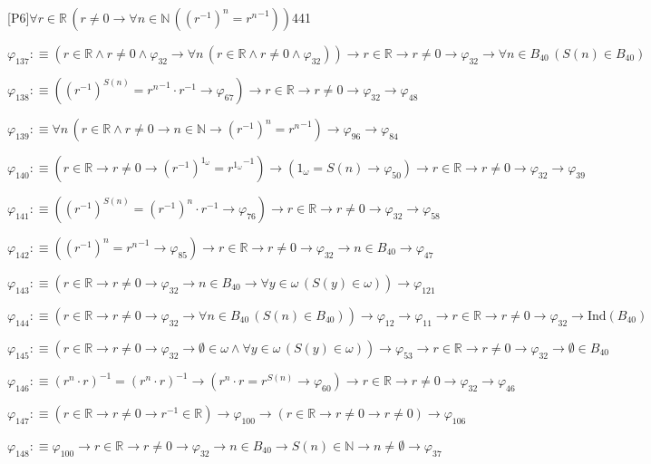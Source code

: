 \begin{fullproof}{[P6]}{$\forall r \in \mathbb{R}\,(r \neq 0 \to \forall n \in \mathbb{N}\,({{(r^{-1})}^{n}} = {{r}^{n}}^{-1}))$}{441}
\begin{abbrevlist}
\item $\varphi_{137} :\equiv (r \in \mathbb{R} \land r \neq 0 \land \varphi_{32} \to \forall n\,(r \in \mathbb{R} \land r \neq 0 \land \varphi_{32})) \to r \in \mathbb{R} \to r \neq 0 \to \varphi_{32} \to \forall n \in B_{40}\,(S(n) \in B_{40})$
\item $\varphi_{138} :\equiv ({{(r^{-1})}^{S(n)}} = {{r}^{n}}^{-1} \cdot r^{-1} \to \varphi_{67}) \to r \in \mathbb{R} \to r \neq 0 \to \varphi_{32} \to \varphi_{48}$
\item $\varphi_{139} :\equiv \forall n\,(r \in \mathbb{R} \land r \neq 0 \to n \in \mathbb{N} \to {{(r^{-1})}^{n}} = {{r}^{n}}^{-1}) \to \varphi_{96} \to \varphi_{84}$
\item $\varphi_{140} :\equiv (r \in \mathbb{R} \to r \neq 0 \to {{(r^{-1})}^{1_{\omega}}} = {{r}^{1_{\omega}}}^{-1}) \to (1_{\omega} = S(n) \to \varphi_{50}) \to r \in \mathbb{R} \to r \neq 0 \to \varphi_{32} \to \varphi_{39}$
\item $\varphi_{141} :\equiv ({{(r^{-1})}^{S(n)}} = {{(r^{-1})}^{n}} \cdot r^{-1} \to \varphi_{76}) \to r \in \mathbb{R} \to r \neq 0 \to \varphi_{32} \to \varphi_{58}$
\item $\varphi_{142} :\equiv ({{(r^{-1})}^{n}} = {{r}^{n}}^{-1} \to \varphi_{85}) \to r \in \mathbb{R} \to r \neq 0 \to \varphi_{32} \to n \in B_{40} \to \varphi_{47}$
\item $\varphi_{143} :\equiv (r \in \mathbb{R} \to r \neq 0 \to \varphi_{32} \to n \in B_{40} \to \forall y \in \omega\,(S(y) \in \omega)) \to \varphi_{121}$
\item $\varphi_{144} :\equiv (r \in \mathbb{R} \to r \neq 0 \to \varphi_{32} \to \forall n \in B_{40}\,(S(n) \in B_{40})) \to \varphi_{12} \to \varphi_{11} \to r \in \mathbb{R} \to r \neq 0 \to \varphi_{32} \to \mathrm{Ind}(B_{40})$
\item $\varphi_{145} :\equiv (r \in \mathbb{R} \to r \neq 0 \to \varphi_{32} \to \emptyset \in \omega \land \forall y \in \omega\,(S(y) \in \omega)) \to \varphi_{53} \to r \in \mathbb{R} \to r \neq 0 \to \varphi_{32} \to \emptyset \in B_{40}$
\item $\varphi_{146} :\equiv ({{r}^{n}} \cdot r)^{-1} = ({{r}^{n}} \cdot r)^{-1} \to ({{r}^{n}} \cdot r = {{r}^{S(n)}} \to \varphi_{60}) \to r \in \mathbb{R} \to r \neq 0 \to \varphi_{32} \to \varphi_{46}$
\item $\varphi_{147} :\equiv (r \in \mathbb{R} \to r \neq 0 \to r^{-1} \in \mathbb{R}) \to \varphi_{100} \to (r \in \mathbb{R} \to r \neq 0 \to r \neq 0) \to \varphi_{106}$
\item $\varphi_{148} :\equiv \varphi_{100} \to r \in \mathbb{R} \to r \neq 0 \to \varphi_{32} \to n \in B_{40} \to S(n) \in \mathbb{N} \to n \neq \emptyset \to \varphi_{37}$

\end{abbrevlist}
\end{fullproof}
